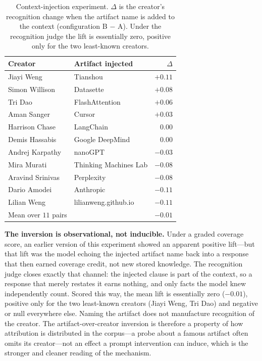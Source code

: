 \begin{table}[!htbp]
\centering
\small
\caption{Context-injection experiment. $\Delta$ is the creator's recognition change when the artifact name is added to the context (configuration B $-$ A). Under the recognition judge the lift is essentially zero, positive only for the two least-known creators.}
\label{tab:injection}
\begin{tabular}{llr}
\toprule
Creator & Artifact injected & $\Delta$ \\
\midrule
Jiayi Weng & Tianshou & $+0.11$ \\
Simon Willison & Datasette & $+0.08$ \\
Tri Dao & FlashAttention & $+0.06$ \\
Aman Sanger & Cursor & $+0.03$ \\
Harrison Chase & LangChain & $0.00$ \\
Demis Hassabis & Google DeepMind & $0.00$ \\
Andrej Karpathy & nanoGPT & $-0.03$ \\
Mira Murati & Thinking Machines Lab & $-0.08$ \\
Aravind Srinivas & Perplexity & $-0.08$ \\
Dario Amodei & Anthropic & $-0.11$ \\
Lilian Weng & lilianweng.github.io & $-0.11$ \\
\midrule
Mean over $11$ pairs & & $-0.01$ \\
\bottomrule
\end{tabular}
\end{table}

\textbf{The inversion is observational, not inducible.} Under a graded coverage score, an earlier version of this experiment showed an apparent positive lift---but that lift was the model echoing the injected artifact name back into a response that then earned coverage credit, not new stored knowledge. The recognition judge closes exactly that channel: the injected clause is part of the context, so a response that merely restates it earns nothing, and only facts the model knew independently count. Scored this way, the mean lift is essentially zero ($-0.01$), positive only for the two least-known creators (Jiayi Weng, Tri Dao) and negative or null everywhere else. Naming the artifact does not manufacture recognition of the creator. The artifact-over-creator inversion is therefore a property of how attribution is distributed in the corpus---a probe about a famous artifact often omits its creator---not an effect a prompt intervention can induce, which is the stronger and cleaner reading of the mechanism.

